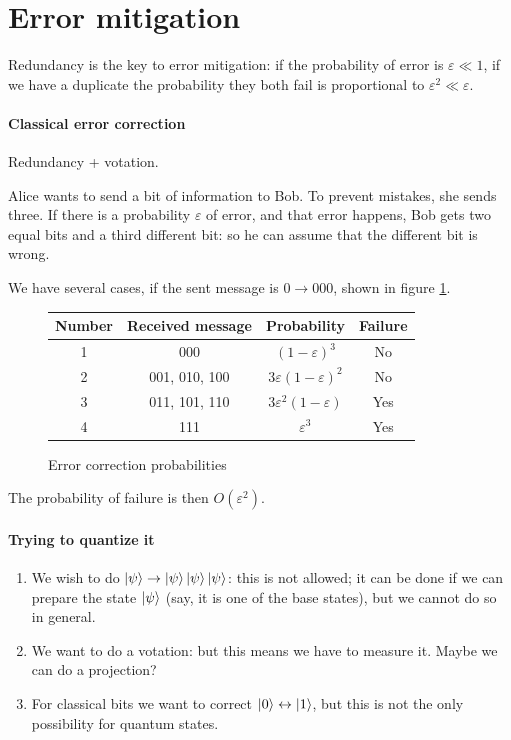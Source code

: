 \documentclass[main.tex]{subfiles}
\begin{document}
\section{Error mitigation}

Redundancy is the key to error mitigation: if the probability of error is \(\varepsilon \ll 1\), if we have a duplicate the probability they both fail is proportional to \(\varepsilon^2 \ll \varepsilon\).

\paragraph{Classical error correction}

Redundancy + votation.

Alice wants to send a bit of information to Bob. To prevent mistakes, she sends three. If there is a probability \(\varepsilon\) of error, and that error happens, Bob gets two equal bits and a third different bit: so he can assume that the different bit is wrong.

We have several cases, if the sent message is \(0 \rightarrow 000\), shown in figure \ref{fig:error-correction}.

\begin{figure}[H]
  \centering
  \begin{tabular}{c|c|c|c}
    Number & Received message & Probability & Failure \\
    \hline
    1 & 000 & \((1-\varepsilon)^3\) & No \\
    2 & 001, 010, 100 & \(3\varepsilon (1-\varepsilon)^2\) & No \\
    3 & 011, 101, 110  & \(3 \varepsilon ^2 (1-\varepsilon)\) & Yes \\
    4 & 111 & \(\varepsilon^3\) & Yes
  \end{tabular}
  \caption{Error correction probabilities}
  \label{fig:error-correction}
\end{figure}

The probability of failure is then \(O(\varepsilon^2)\).

\paragraph{Trying to quantize it}

\begin{enumerate}
  \item We wish to do \(\ket{\psi} \rightarrow \ket{\psi}\ket{\psi}\ket{\psi}\): this is not allowed; it can be done if we can prepare the state \(\ket{\psi}\) (say, it is one of the base states), but we cannot do so in general.
  \item We want to do a votation: but this means we have to measure it. Maybe we can do a projection?
  \item For classical bits we want to correct \(\ket{0} \leftrightarrow \ket{1}\), but this is not the only possibility for quantum states.
\end{enumerate}
\end{document}
